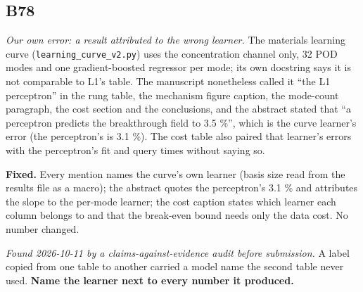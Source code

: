 \documentclass[10pt]{article}
\begin{document}
\subsection*{B78}\label{led:B78}
\begin{description}[leftmargin=0pt,itemsep=1pt]
\item[Defect.] \emph{Our own error: a result attributed to the wrong learner.} The materials learning curve (\texttt{learning\_curve\_v2.py}) uses the concentration channel only, 32 POD modes and one gradient-boosted regressor per mode; its own docstring says it is not comparable to L1's table. The manuscript nonetheless called it ``the L1 perceptron'' in the rung table, the mechanism figure caption, the mode-count paragraph, the cost section and the conclusions, and the abstract stated that ``a perceptron predicts the breakthrough field to 3.5 \%'', which is the curve learner's error (the perceptron's is 3.1 \%). The cost table also paired that learner's errors with the perceptron's fit and query times without saying so.
\item[Resolution.] \textbf{Fixed.} Every mention names the curve's own learner (basis size read from the results file as a macro); the abstract quotes the perceptron's 3.1 \% and attributes the slope to the per-mode learner; the cost caption states which learner each column belongs to and that the break-even bound needs only the data cost. No number changed.
\item[Note.] \emph{Found 2026-10-11 by a claims-against-evidence audit before submission.} A label copied from one table to another carried a model name the second table never used. \textbf{Name the learner next to every number it produced.}
\end{description}
\end{document}
